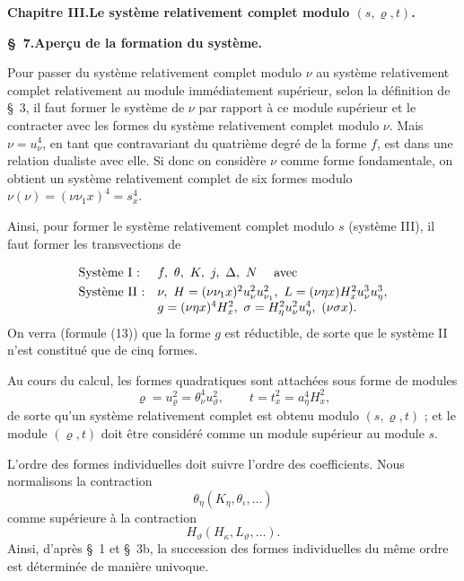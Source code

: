 \documentclass[11pt]{article}
\newcommand{\A}{\Delta}
\begin{document}
\clearpage

\begin{center}
{\Large\bfseries Chapitre III.\quad Le système relativement complet modulo $(s,\varrho,t)$.}
\end{center}

\begin{center}
\textbf{\S\ 7.\quad Aperçu de la formation du système.}
\end{center}

Pour passer du système relativement complet modulo $\nu$ au système relativement complet relativement au module immédiatement supérieur, selon la définition de \S\ 3, il faut former le système de $\nu$ par rapport à ce module supérieur et le contracter avec les formes du système relativement complet modulo $\nu$. Mais $\nu=u_\nu^4$, en tant que contravariant du quatrième degré de la forme $f$, est dans une relation dualiste avec elle. Si donc on considère $\nu$ comme forme fondamentale, on obtient un système relativement complet de six formes modulo $\nu(\nu)=(\nu\nu_1x)^4=s_x^4$.

Ainsi, pour former le système relativement complet modulo $s$ (système III), il faut former les transvections de
\[
\begin{array}{ll}
\text{Système I :} & f,\ \theta,\ K,\ j,\ \A,\ N\quad \text{ avec}\vphantom{\dfrac11}\\[0.3em]
\text{Système II :} & \nu,\ H=(\nu\nu_1x)^2u_\nu^2u_{\nu_1}^2,\ L=(\nu\eta x)H_x^2u_\nu^3u_\eta^3,\\
& g=(\nu\eta x)^4H_x^2,\ \sigma=H_\eta^2u_\nu^2u_\eta^4,\ (\nu\sigma x).
\end{array}
\]
On verra (formule (13)) que la forme $g$ est réductible, de sorte que le système II n'est constitué que de cinq formes.

Au cours du calcul, les formes quadratiques sont attachées sous forme de modules
\[
\varrho=u_\varrho^2=\theta_\nu^4u_\vartheta^2,
\qquad
 t=t_x^2=a_\eta^4H_x^2,
\]
de sorte qu'un système relativement complet est obtenu modulo $(s,\varrho,t)$ ; et le module $(\varrho,t)$ doit être considéré comme un module supérieur au module $s$.

L'ordre des formes individuelles doit suivre l'ordre des coefficients. Nous normalisons la contraction
\[
\theta_\eta(K_\eta,\theta_\iota,\ldots)
\]
comme supérieure à la contraction
\[
H_\vartheta(H_\kappa,L_\vartheta,\ldots).
\]
Ainsi, d'après \S\ 1 et \S\ 3b, la succession des formes individuelles du même ordre est déterminée de manière univoque.
\end{document}
